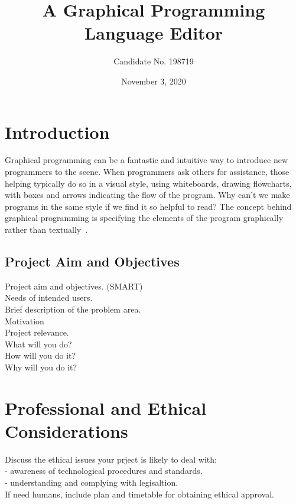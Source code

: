 \documentclass[a4paper, 12pt]{article}
\begin{document}
    \title{A Graphical Programming Language Editor}
    \author{Candidate No. 198719}
    \date{November 3, 2020}
    \clearpage\maketitle
    \thispagestyle{empty}

    \newpage\clearpage\thispagestyle{empty}
    \tableofcontents
    \newpage
    \setcounter{page}{1}

    \section{Introduction}
    Graphical programming can be a fantastic and intuitive way to introduce new programmers to
    the scene. When programmers ask others for assistance, those helping typically do so in a visual 
    style, using whiteboards, drawing flowcharts, with boxes and arrows indicating the flow 
    of the program. Why can't we make programs in the same style if we find it so helpful to read? 
    The concept behind graphical programming is specifying the elements of the program graphically 
    rather than textually~\cite{dehouck2015maturity}.
    
        \subsection{Project Aim and Objectives}
    



    Project aim and objectives. (SMART) \\
    Needs of intended users. \\
    Brief description of the problem area. \\
    Motivation \\
    Project relevance. \\
    What will you do? \\ 
    How will you do it? \\ 
    Why will you do it? \\


    \section{Professional and Ethical Considerations}
    Discuss the ethical issues your prject is likely to deal with: \\
    - awareness of technological procedures and standards. \\
    - understanding and complying with legisaltion. \\
    If need humans, include plan and timetable for obtaining ethical approval.
\end{document}
